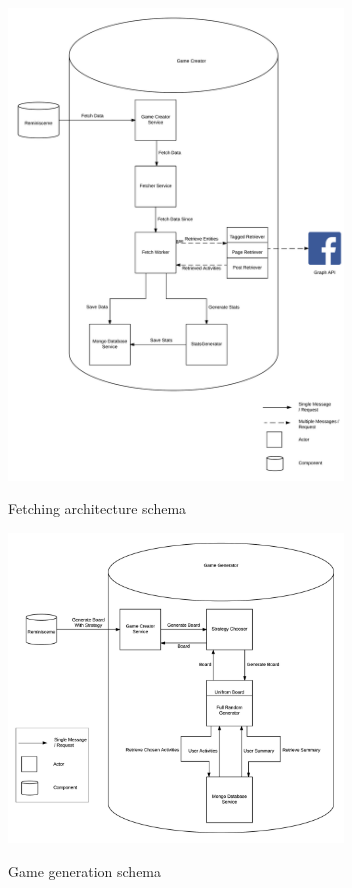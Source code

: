 \begin{figure}[!h]
\center
{\includegraphics[width=3.5in]{images/fetch_arch.png}}
\caption{Fetching architecture schema}
\label{fig:fetchArch}
\end{figure}
\begin{figure}[!h]
\center
{\includegraphics[width=3.5in]{images/gc_arch.png}}
\caption{Game generation schema}
\label{fig:gameCreationArch}
\end{figure}
